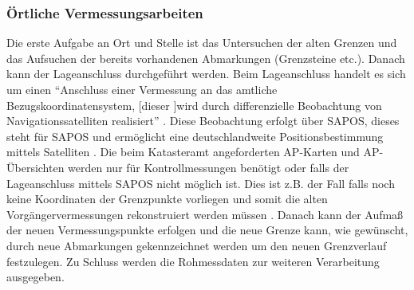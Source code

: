
\subsubsection{Örtliche Vermessungsarbeiten}

Die erste Aufgabe an Ort und Stelle ist das Untersuchen der alten Grenzen und das Aufsuchen der bereits vorhandenen Abmarkungen (Grenzsteine etc.).
Danach kann der Lageanschluss durchgeführt werden. Beim Lageanschluss handelt es sich um einen \enquote{Anschluss einer Vermessung an das amtliche Bezugskoordinatensystem, [dieser ]wird durch differenzielle Beobachtung von Navigationssatelliten realisiert} \autocite{bier-lage}.
Diese Beobachtung erfolgt über \acs{SAPOS}, dieses steht für \acl{SAPOS} und ermöglicht eine deutschlandweite Positionsbestimmung mittels Satelliten \autocite[vgl.][2]{sapos-prospekt}.
Die beim Katasteramt angeforderten AP-Karten und AP-Übersichten werden nur für Kontrollmessungen benötigt oder falls der Lageanschluss mittels \acs{SAPOS} nicht möglich ist. Dies ist z.B. der Fall falls noch keine Koordinaten der Grenzpunkte vorliegen und somit die alten Vorgängervermessungen rekonstruiert werden müssen \autocite[vgl.][]{wolff-gps}. 
Danach kann der Aufmaß der neuen Vermessungspunkte erfolgen und 
die neue Grenze kann, wie gewünscht, durch neue Abmarkungen gekennzeichnet werden um den neuen Grenzverlauf festzulegen. Zu Schluss werden die Rohmessdaten zur weiteren Verarbeitung ausgegeben.

